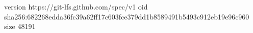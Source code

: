 version https://git-lfs.github.com/spec/v1
oid sha256:682268edda36fc39a62ff17c603fce379dd1b8589491b5493c912eb19e96c960
size 48191
